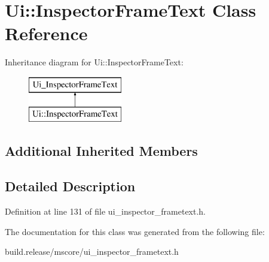 \hypertarget{class_ui_1_1_inspector_frame_text}{}\section{Ui\+:\+:Inspector\+Frame\+Text Class Reference}
\label{class_ui_1_1_inspector_frame_text}
Inheritance diagram for Ui\+:\+:Inspector\+Frame\+Text\+:\begin{figure}[H]
\begin{center}
\leavevmode
\includegraphics[height=2.000000cm]{class_ui_1_1_inspector_frame_text}
\end{center}
\end{figure}
\subsection*{Additional Inherited Members}


\subsection{Detailed Description}


Definition at line 131 of file ui\+\_\+inspector\+\_\+frametext.\+h.



The documentation for this class was generated from the following file\+:\begin{DoxyCompactItemize}
\item 
build.\+release/mscore/ui\+\_\+inspector\+\_\+frametext.\+h\end{DoxyCompactItemize}
